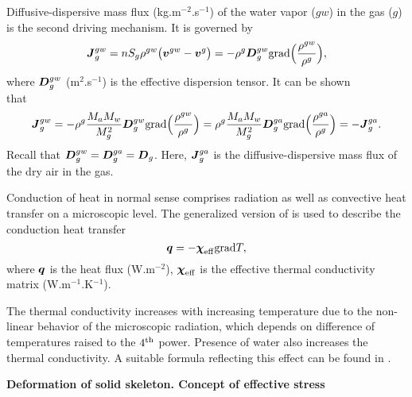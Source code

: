 Diffusive-dispersive mass flux (kg.m$^{-2}$.s$^{-1}$) of the water vapor ($gw$) in the gas
 ($g$) is the second driving mechanism. It is governed by {}
\begin{equation}\label{fick}
\mbox{\boldmath$J$}^{gw}_g = n S_g \rho^{gw} \big( \mbox{\boldmath$v$} ^{gw} - \mbox{\boldmath$v$} ^g \big) = - \rho^g \mbox{\boldmath$D$}^{gw}_g 
{\rm grad} \Big( \frac{\rho^{gw}}{\rho^g} \Big),
\end{equation}
where $\mbox{\boldmath$D$}^{gw}_g$ (m$^2$.s$^{-1}$) is the effective dispersion tensor. It can be shown \\ \cite{lewis} that
\begin{equation}
\mbox{\boldmath$J$}^{gw}_g = - \rho^g \frac{M_a M_w}{M^2_g} \mbox{\boldmath$D$}^{gw}_g {\rm grad} \Big( \frac{\rho^{gw}}{\rho^g} \Big)
= \rho^g \frac{M_a M_w}{M^2_g} \mbox{\boldmath$D$}^{ga}_g {\rm grad} \Big( \frac{\rho^{ga}}{\rho^g} \Big) = - \mbox{\boldmath$J$}^{ga}_g.
\end{equation}
Recall that $\mbox{\boldmath$D$}^{gw}_g = \mbox{\boldmath$D$}^{ga}_g = \mbox{\boldmath$D$}_g$.
Here, $\mbox{\boldmath$J$}_g^{ga}$ is the diffusive-dispersive mass flux of the dry air in the gas.

Conduction of heat in normal sense comprises radiation as well as convective heat transfer on a 
microscopic level. The generalized version of {} is used to describe the conduction
 heat transfer
\begin{equation}\label{fourier}
\mbox{\boldmath$q$} = - \mbox{\boldmath$\chi$}_{\rm eff} {\rm grad} T,
\end{equation}
where $\mbox{\boldmath$q$}$ is the heat flux (W.m$^{-2}$), $\mbox{\boldmath$\chi$}_{\rm eff}$ is the effective thermal conductivity matrix 
(W.m$^{-1}$.K$^{-1}$).

The thermal conductivity increases with increasing temperature due to the non-linear 
behavior of the microscopic radiation, which depends on difference of temperatures raised to the 
$4^{\rm{th}}$ power. Presence of water also increases the thermal conductivity. A suitable formula
reflecting this effect can be found in \cite{lewis}.

{\bf Deformation of solid skeleton. Concept of effective stress}

